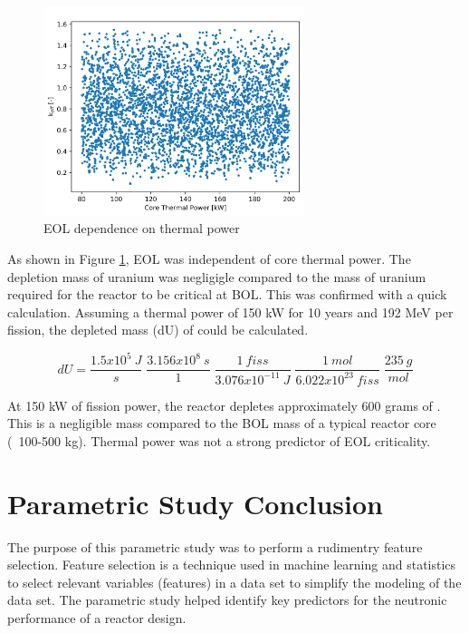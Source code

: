 \begin{figure}[h]
    \centering
    \includegraphics[width=3in]{../images/keff_vs_power.png}
\caption{EOL \keff dependence on thermal power}
\label{fig:eol_keff_vs_power}
\end{figure}

As shown in Figure \ref{fig:eol_keff_vs_power}, EOL \keff was independent of core
thermal power. The depletion mass of uranium was negligigle compared to the mass 
of uranium required for the reactor to be critical at BOL. This was confirmed
with a quick calculation. Assuming a thermal power of 150 kW for 10 years and
192 MeV per fission, the depleted mass (dU) of \uran could be calculated.

\begin{equation}
    dU = \frac{1.5x10^5\:J}{s}\;\frac{3.156x10^8\:s}{1}\;\frac{1\:
    fiss}{3.076x10^{-11}\:J}\;\frac{1\:mol}{6.022x10^{23}\:fiss}\;\frac{235\:
    g}{mol}
\end{equation}

At 150 kW of fission power, the reactor depletes approximately 600 grams of
\uran. This is a negligible mass compared to the BOL mass of a typical reactor
core (~100-500 kg). Thermal power was not a strong predictor of EOL criticality.

\section{Parametric Study Conclusion}
The purpose of this parametric study was to perform a rudimentry feature
selection. Feature selection is a technique used in machine learning and
statistics to select relevant variables (features) in a data set to simplify the
modeling of the data set. The parametric study helped identify key predictors
for the neutronic performance of a reactor design.

